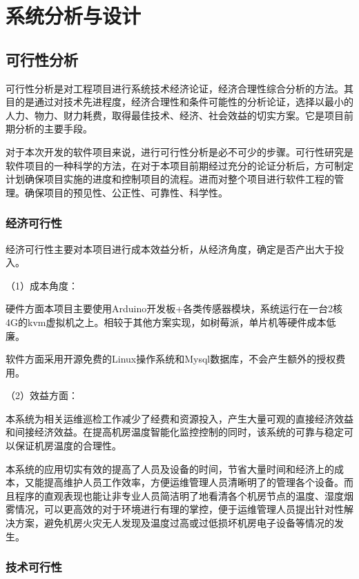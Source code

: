 \section{系统分析与设计}

\subsection{可行性分析}

可行性分析是对工程项目进行系统技术经济论证，经济合理性综合分析的方法。其目的是通过对技术先进程度，经济合理性和条件可能性的分析论证，选择以最小的人力、物力、财力耗费，取得最佳技术、经济、社会效益的切实方案。它是项目前期分析的主要手段。

对于本次开发的软件项目来说，进行可行性分析是必不可少的步骤。可行性研究是软件项目的一种科学的方法，在对于本项目前期经过充分的论证分析后，方可制定计划确保项目实施的进度和控制项目的流程。进而对整个项目进行软件工程的管理。确保项目的预见性、公正性、可靠性、科学性。


\subsubsection{经济可行性}

经济可行性主要对本项目进行成本效益分析，从经济角度，确定是否产出大于投入。

（1）成本角度：

硬件方面本项目主要使用Arduino开发板+各类传感器模块，系统运行在一台2核4G的kvm虚拟机之上。相较于其他方案实现，如树莓派，单片机等硬件成本低廉。

软件方面采用开源免费的Linux操作系统和Mysql数据库，不会产生额外的授权费用。

（2）效益方面：

本系统为相关运维巡检工作减少了经费和资源投入，产生大量可观的直接经济效益和间接经济效益。在提高机房温度智能化监控控制的同时，该系统的可靠与稳定可以保证机房温度的合理性。

本系统的应用切实有效的提高了人员及设备的时间，节省大量时间和经济上的成本，又能提高维护人员工作效率，方便运维管理人员清晰明了的管理各个设备。而且程序的直观表现也能让非专业人员简洁明了地看清各个机房节点的温度、湿度烟雾情况，可以更高效的对于环境进行有理的掌控，便于运维管理人员提出针对性解决方案，避免机房火灾无人发现及温度过高或过低损坏机房电子设备等情况的发生。

\subsubsection{技术可行性}

